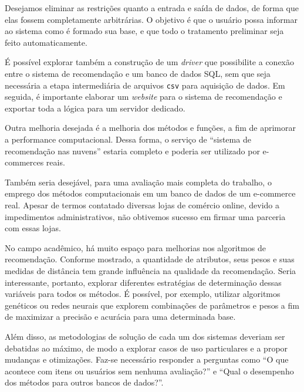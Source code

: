 Desejamos eliminar as restrições quanto a entrada e saída de dados, de forma que elas fossem completamente arbitrárias. O objetivo é que o usuário possa informar ao sistema como é formado sua base, e que todo o tratamento preliminar seja feito automaticamente. 

É possível explorar também a construção de um \textit{driver} que possibilite a conexão entre o sistema de recomendação e um banco de dados SQL, sem que seja necessária a etapa intermediária de arquivos \texttt{csv} para aquisição de dados. Em seguida, é importante elaborar um \textit{website} para o sistema de recomendação e exportar toda a lógica para um servidor dedicado. 

Outra melhoria desejada é a melhoria dos métodos e funções, a fim de aprimorar a performance computacional. Dessa forma, o serviço de ``sistema de recomendação nas nuvens'' estaria completo e poderia ser utilizado por e-commerces reais.

Também seria desejável, para uma avaliação mais completa do trabalho, o emprego dos métodos computacionais em um banco de dados de um e-commerce real. Apesar de termos contatado diversas lojas de comércio online, devido a impedimentos administrativos, não obtivemos sucesso em firmar uma parceria com essas lojas. 

No campo acadêmico, há muito espaço para melhorias nos algoritmos de recomendação. Conforme mostrado, a quantidade de atributos, seus pesos e suas medidas de distância tem grande influência na qualidade da recomendação. Seria interessante, portanto, explorar diferentes estratégias de determinação dessas variáveis para todos os métodos. É possível, por exemplo, utilizar algoritmos genéticos ou redes neurais que explorem combinações de parâmetros e pesos a fim de maximizar a precisão e acurácia para uma determinada base.

Além disso, as metodologias de solução de cada um dos sistemas deveriam ser debatidas ao máximo, de modo a explorar casos de uso particulares e a propor mudanças e otimizações. Faz-se necessário responder a perguntas como ``O que acontece com itens ou usuários sem nenhuma avaliação?'' e ``Qual o desempenho dos métodos para outros bancos de dados?''. 
